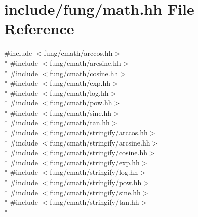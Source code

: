 \hypertarget{math_8hh}{\section{include/fung/math.hh File Reference}
\label{math_8hh}
}
{\ttfamily \#include $<$fung/cmath/arccos.\-hh$>$}\\*
{\ttfamily \#include $<$fung/cmath/arcsine.\-hh$>$}\\*
{\ttfamily \#include $<$fung/cmath/cosine.\-hh$>$}\\*
{\ttfamily \#include $<$fung/cmath/exp.\-hh$>$}\\*
{\ttfamily \#include $<$fung/cmath/log.\-hh$>$}\\*
{\ttfamily \#include $<$fung/cmath/pow.\-hh$>$}\\*
{\ttfamily \#include $<$fung/cmath/sine.\-hh$>$}\\*
{\ttfamily \#include $<$fung/cmath/tan.\-hh$>$}\\*
{\ttfamily \#include $<$fung/cmath/stringify/arccos.\-hh$>$}\\*
{\ttfamily \#include $<$fung/cmath/stringify/arcsine.\-hh$>$}\\*
{\ttfamily \#include $<$fung/cmath/stringify/cosine.\-hh$>$}\\*
{\ttfamily \#include $<$fung/cmath/stringify/exp.\-hh$>$}\\*
{\ttfamily \#include $<$fung/cmath/stringify/log.\-hh$>$}\\*
{\ttfamily \#include $<$fung/cmath/stringify/pow.\-hh$>$}\\*
{\ttfamily \#include $<$fung/cmath/stringify/sine.\-hh$>$}\\*
{\ttfamily \#include $<$fung/cmath/stringify/tan.\-hh$>$}\\*
